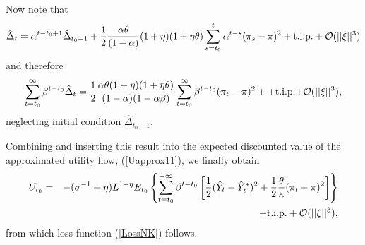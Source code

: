 \documentclass[11pt,aspectratio=169]{beamer}
\begin{document}
\begin{frame}\small
Now note that%
\begin{equation*}
\hat{\Delta}_{t}=\alpha ^{t-t_{0}+1}\hat{\Delta}_{t_{0}-1}+\frac{1}{2}{\frac{%
\alpha \theta }{(1-\alpha )}}(1+\eta )(1+\eta \theta
)\sum_{s=t_{0}}^{t}\alpha ^{t-s}(\pi _{s}-\pi )^{2}+\mathrm{t.i.p.}+\mathcal{%
O(}||\xi ||^{3})
\end{equation*}%
and therefore 
\begin{equation}
\sum_{t=t_{0}}^{\infty }\beta ^{t-t_{0}}\hat{\Delta}_{t}=\frac{1}{2}{\frac{%
\alpha \theta (1+\eta )(1+\eta \theta )}{(1-\alpha )(1-\alpha \beta )}}%
\sum_{t=t_{0}}^{\infty }\beta ^{t-t_{0}}(\pi _{t}-\pi )^{2}++\mathrm{t.i.p.+}%
\mathcal{O(}||\xi ||^{3}),  \label{ddd}
\end{equation}%
neglecting initial condition $\hat{\Delta}_{t_{0}-1}$.
\end{frame}
\begin{frame}\small
Combining and inserting this result into the expected discounted value of
the approximated utility flow, (\ref{Uapprox11}), we finally obtain%
\begin{eqnarray*}
U_{t_{0}} &=&-(\sigma ^{-1}+\eta )L^{1+\eta }E_{t_{0}}\left\{
\sum_{t=t_{0}}^{+\infty }\beta ^{t-t_{0}}\left[ \frac{1}{2}(\hat{Y}_{t}-\hat{%
Y}_{t}^{\ast })^{2}+\frac{1}{2}\frac{\theta }{\kappa }(\pi _{t}-\pi )^{2}%
\right] \right\} \\
&&+\text{t.i.p.}+\mathcal{O}(||\xi ||^{3}),
\end{eqnarray*}%
from which loss function (\ref{LossNK}) follows.
\begin{center}
\hyperlink{Loss Function}{}
\end{center}
\end{frame}
\end{document}
